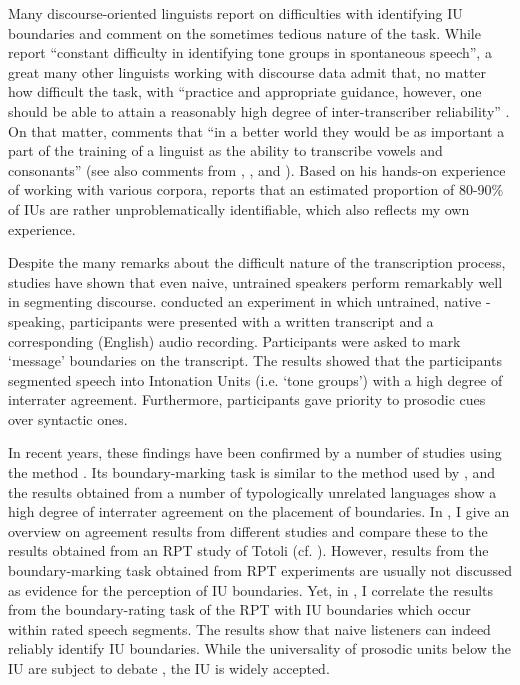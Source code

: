 
Many discourse-oriented linguists report on difficulties with identifying IU boundaries and comment on the sometimes tedious nature of the task. While \citet[46]{brown2015questions} report ``constant difficulty in identifying tone groups in spontaneous
speech'', a great many other linguists working with discourse data admit that, no matter how difficult the task, with ``practice and appropriate guidance, however, one
should be able to attain a reasonably high degree of inter-transcriber reliability'' \citep[112]{dubois1992}. On that matter, \citet{chafe1994discourse} comments that “in a better world they would be as important a part of the training of a linguist as the ability to transcribe vowels and consonants” (see also comments from  \citealt[165]{Schuetze-Coburn1994}, \citealt[206]{crystal1969prosodic}, and \citealt[29]{cruttenden1997intonation}). Based on his hands-on experience of working with various corpora, \citet[261]{himmelmann2006challenges} reports that an estimated proportion of 80-90\% of IUs are rather unproblematically identifiable, which also reflects my own experience. 


Despite the many remarks about the difficult nature of the transcription process, studies have shown that even naive, untrained speakers perform remarkably well in segmenting discourse.  \citet{Kreckel_1981}  conducted an experiment in which untrained, native -speaking, participants were presented with a written transcript and a corresponding (English) audio recording. Participants were asked to mark ‘message’ boundaries on the transcript.  The results showed that the participants segmented speech into Intonation Units (i.e. `tone groups') with a high degree of interrater agreement. Furthermore, participants gave priority to prosodic cues over syntactic ones. 


In recent years, these findings have been confirmed by a number of studies using the  method  
\citep[RPT;][]{Cole2016}. Its boundary-marking task is  similar to the method used by \citet{Kreckel_1981}, and the results obtained from a number of typologically unrelated languages show a high degree of interrater agreement on the placement of boundaries.  In  , I give an overview on agreement results from different studies and compare these to  the  results obtained from an RPT  study of Totoli (cf.  ). However, results from the boundary-marking task obtained  from RPT  experiments are usually not discussed as evidence for the perception of IU boundaries. Yet, in  , I correlate the results from the boundary-rating task of the RPT with IU boundaries which occur within rated speech segments. The results show that naive listeners can indeed reliably identify IU boundaries. While the universality of prosodic units below the IU are subject to debate \citep{Bickel_2009, schiering2010prosodic}, the IU is widely accepted.

